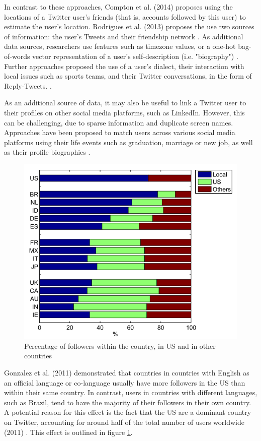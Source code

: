 \documentclass[10pt,a4paper]{article}
\begin{document}
In contrast to these approaches, Compton et al. (2014) proposes using the locations of a Twitter user's friends \cite{comp14a} (that is, accounts followed by this user) to estimate the user's location. Rodrigues et al. (2013) proposes the use two sources of information: the user's Tweets and their friendship network \cite{rodr13a}. As additional data sources, researchers use features such as timezone values, or a one-hot bag-of-words vector representation of a user's self-description (i.e. "biography") \cite{han16a}. Further approaches proposed the use of a user's dialect, their interaction with local issues such as sports teams, and their Twitter conversations, in the form of Reply-Tweets. \cite{dred13a, chan11a}. 

As an additional source of data, it may also be useful to link a Twitter user to their profiles on other social media platforms, such as LinkedIn. However, this can be challenging, due to sparse information and duplicate screen names. Approaches have been proposed to match users across various social media platforms using their life events such as graduation, marriage or new job, as well as their profile biographies \cite{hazi17a}.

\begin{figure}
	\centering
	\includegraphics[scale=0.80]{follower-distribution}
	\caption{Percentage of followers within the country, in US and in other countries \cite{gonz11a}}
	\label{fig:follower-distribution}
\end{figure}

Gonzalez et al. (2011) demonstrated that countries in countries with English as an official language or co-language usually have more followers in the US than within their same country. In contrast, users in countries with different languages, such as Brazil, tend to have the majority of their followers in their own country. A potential reason for this effect is the fact that the US are a dominant country on Twitter, accounting for around half of the total number of users worldwide (2011) \cite{gonz11a}. This effect is outlined in figure \ref{fig:follower-distribution}.
\end{document}
